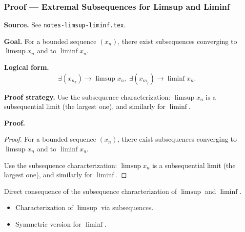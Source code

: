 
\clearpage
{}
\hypertarget{proof-RA-ABB-T-limsup-extremal}{}

\subsubsection[Extremal Subsequences for Limsup and Liminf]{Proof --- Extremal Subsequences for Limsup and Liminf}

\bigskip

\noindent
\textbf{Source.}
See \texttt{notes-limsup-liminf.tex}.

\vspace{0.75em}

\noindent
\textbf{Goal.}
For a bounded sequence $(x_n)$, there exist subsequences converging to $\limsup x_n$ and to $\liminf x_n$.

\vspace{0.75em}

\noindent
\textbf{Logical form.}
\[
  \exists (x_{n_k}) \to \limsup x_n,\; \exists (x_{m_j}) \to \liminf x_n.
\]

\vspace{0.75em}

\noindent
\textbf{Proof strategy.}
Use the subsequence characterization: $\limsup x_n$ is a subsequential limit (the largest one), and similarly for $\liminf$.

\vspace{0.75em}

\noindent
\textbf{Proof.}
\begin{proof}
\Claim For a bounded sequence $(x_n)$, there exist subsequences converging to $\limsup x_n$ and to $\liminf x_n$.

\Given 

\Goal 

\Strategy Use the subsequence characterization: $\limsup x_n$ is a subsequential limit (the largest one), and similarly for $\liminf$.

\medskip


\end{proof}

\begin{remark*}
Direct consequence of the subsequence characterization of $\limsup$ and $\liminf$.
\end{remark*}

\begin{remark*}[Dependencies]
\begin{itemize}
  \item Characterization of $\limsup$ via subsequences.
  \item Symmetric version for $\liminf$.
\end{itemize}
\end{remark*}
